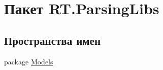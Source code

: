 \hypertarget{namespace_r_t_1_1_parsing_libs}{\section{Пакет R\+T.\+Parsing\+Libs}
\label{namespace_r_t_1_1_parsing_libs}
}
\subsection*{Пространства имен}
\begin{DoxyCompactItemize}
\item 
package \hyperlink{namespace_r_t_1_1_parsing_libs_1_1_models}{Models}
\end{DoxyCompactItemize}
